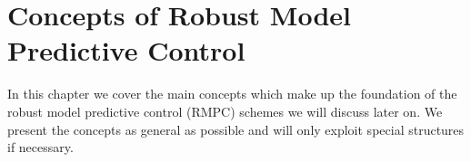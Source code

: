 


\chapter{Concepts of Robust Model Predictive Control}\label{chap:concepts}
%
In this chapter we cover the main concepts which make up the foundation of
the robust model predictive control (RMPC) schemes we will discuss later on.
%
We present the concepts as general as possible and will only exploit special 
structures if necessary.
%


